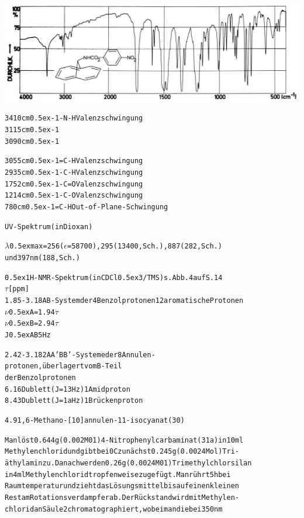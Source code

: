 \documentclass[a4paper,11pt]{article}
\begin{document}
\hspace*{-0.4cm}\includegraphics[width=15.12cm]{IR_035}
\begin{alltt}

3410 cm\raise0.5ex\hbox{-1}    -N-H     Valenzschwingung
3115 cm\raise0.5ex\hbox{-1}
3090 cm\raise0.5ex\hbox{-1}

\newpage
{}


3055 cm\raise0.5ex\hbox{-1}    =C-H     Valenzschwingung
2935 cm\raise0.5ex\hbox{-1}    -C-H     Valenzschwingung
1752 cm\raise0.5ex\hbox{-1}    -C=O     Valenzschwingung
1214 cm\raise0.5ex\hbox{-1}    -C-O     Valenzschwingung
 780 cm\raise0.5ex\hbox{-1}    =C-H     Out-of-Plane-Schwingung

UV-Spektrum (in Dioxan)

\(\lambda\)\lower0.5ex\hbox{max} = 256 (\(\epsilon\) = 58700), 295 (13400, Sch.), 887 (282, Sch.)
             und 397 nm (188, Sch.)

\leavevmode\raise0.5ex\hbox{1}H-NMR-Spektrum (in CDCl\lower0.5ex\hbox{3}/TMS) s. Abb. 4 auf S. 14
  \(\tau\) [ppm]
1.85 - 3.18   AB-System der 4 Benzolprotonen    12 aromatische Protonen
               \(\nu\)\lower0.5ex\hbox{A} = 1.94 \(\tau\)
               \(\nu\)\lower0.5ex\hbox{B} = 2.94 \(\tau\)
               J\lower0.5ex\hbox{AB} 5 Hz

2.42 - 3.18   2 AA'BB'-Systeme der 8 Annulen-
              protonen, überlagert vom B-Teil
              der Benzolprotonen
6.16          Dublett (J = 13 Hz)                1 Amidproton
8.43          Dublett (J = 1a Hz)                1 Brückenproton


4.9 1,6-Methano-[10]annulen-11-isocyanat (30)

Man löst 0.644 g (0.002 M01) 4-Nitrophenylcarbaminat (31a) in 10 ml
Methylenchlorid und gibt bei 0\degree{}C zunächst 0.245 g (0.0024 Mol) Tri-
äthylamin zu. Danach werden 0.26 g (0.0024 M01) Trimethylchlorsilan
in 4 ml Methylenchlorid tropfenweise zugefügt. Man rührt 5 h bei
Raumtemperatur und zieht das Lösungsmittel bis auf einen kleinen
Rest am Rotationsverdampfer ab. Der Rückstand wird mit Methylen-
chlorid an Säule 2 chromatographiert, wobei man die bei 350 nm


\end{alltt}
\end{document}

